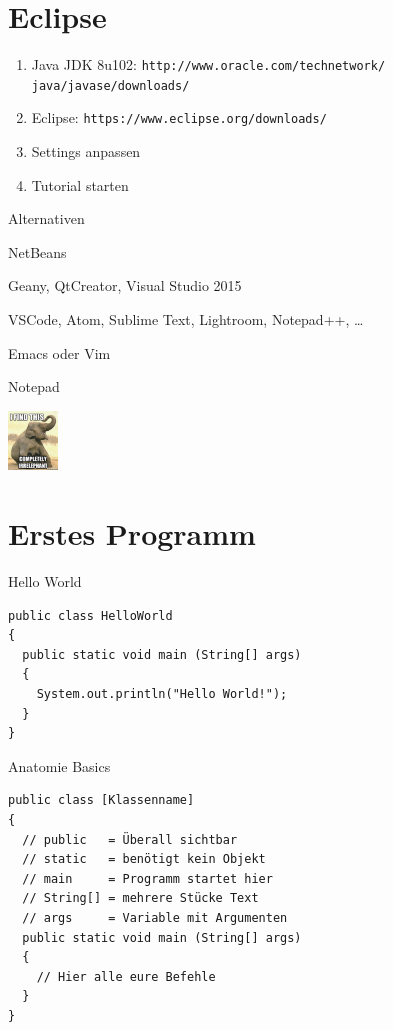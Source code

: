\documentclass{beamer}
\begin{document}
\section{Eclipse}
\begin{frame}
\begin{enumerate}
\item Java JDK 8u102: \texttt{http://www.oracle.com/technetwork/ java/javase/downloads/}
\item Eclipse: \texttt{https://www.eclipse.org/downloads/}
\item Settings anpassen
\item Tutorial starten
\end{enumerate}

\end{frame}

\begin{frame}{Alternativen}
\begin{description}[align=left]
\item[Java IDEs:] NetBeans
\item[Allgemeine IDEs:] Geany, QtCreator, Visual Studio 2015
\item[Editoren:] VSCode, Atom, Sublime Text, Lightroom, Notepad++, \dots
\item[Harte Editoren:] Emacs oder Vim
\item[Hardmode:] Notepad
\end{description}
\vfill

\hfill\includegraphics[width=0.1\textwidth]{img/irrelephant.jpg}
\end{frame}

\section{Erstes Programm}
\begin{frame}[fragile]{Hello World}
\begin{lstlisting}
public class HelloWorld 
{ 
  public static void main (String[] args)
  {
    System.out.println("Hello World!");
  }
}
\end{lstlisting}
\end{frame}

\begin{frame}[fragile]{Anatomie Basics}
\begin{lstlisting}
public class [Klassenname] 
{ 
  // public   = Überall sichtbar
  // static   = benötigt kein Objekt
  // main     = Programm startet hier 
  // String[] = mehrere Stücke Text
  // args     = Variable mit Argumenten
  public static void main (String[] args) 
  {
    // Hier alle eure Befehle
  }
}
\end{lstlisting}
\end{frame}
\end{document}

